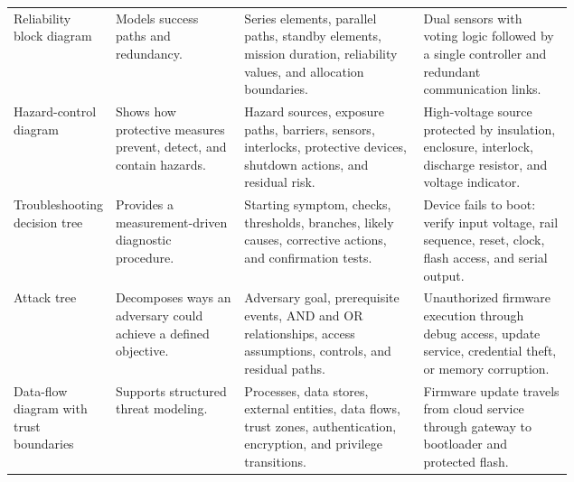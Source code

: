 \begin{singlespace}
\begin{longtable}{@{}L{0.17\linewidth} L{0.23\linewidth} L{0.32\linewidth} L{\tabcolsep\relax}@{}}
\addlinespace[3pt]
Reliability block diagram & Models success paths and redundancy. & Series elements, parallel paths, standby elements, mission duration, reliability values, and allocation boundaries. & Dual sensors with voting logic followed by a single controller and redundant communication links. \\
\addlinespace[3pt]
Hazard-control diagram & Shows how protective measures prevent, detect, and contain hazards. & Hazard sources, exposure paths, barriers, sensors, interlocks, protective devices, shutdown actions, and residual risk. & High-voltage source protected by insulation, enclosure, interlock, discharge resistor, and voltage indicator. \\
\addlinespace[3pt]
Troubleshooting decision tree & Provides a measurement-driven diagnostic procedure. & Starting symptom, checks, thresholds, branches, likely causes, corrective actions, and confirmation tests. & Device fails to boot: verify input voltage, rail sequence, reset, clock, flash access, and serial output. \\
\addlinespace[3pt]
Attack tree & Decomposes ways an adversary could achieve a defined objective. & Adversary goal, prerequisite events, AND and OR relationships, access assumptions, controls, and residual paths. & Unauthorized firmware execution through debug access, update service, credential theft, or memory corruption. \\
\addlinespace[3pt]
Data-flow diagram with trust boundaries & Supports structured threat modeling. & Processes, data stores, external entities, data flows, trust zones, authentication, encryption, and privilege transitions. & Firmware update travels from cloud service through gateway to bootloader and protected flash. \\
\end{longtable}
\end{singlespace}


